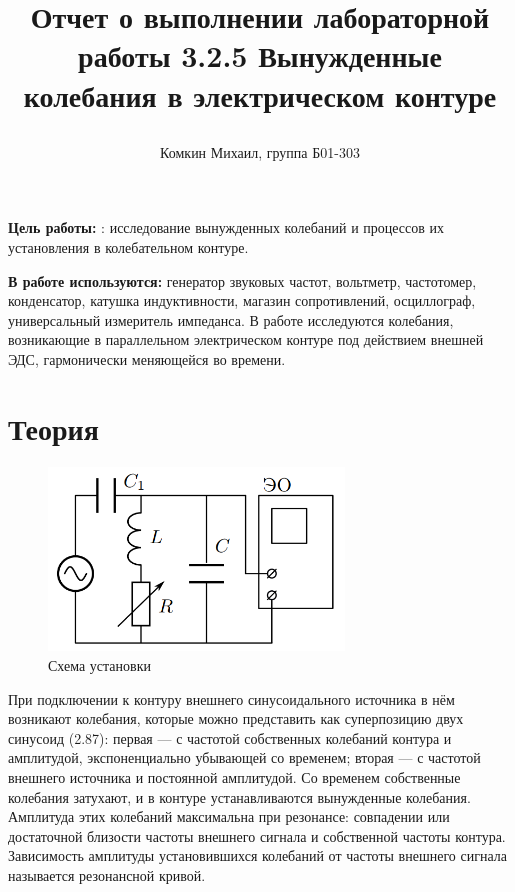 \documentclass[12pt,a4paper]{article}
\title{
Отчет о выполнении лабораторной работы 3.2.5
Вынужденные колебания в электрическом контуре

}
\author{Комкин Михаил, группа Б01-303}
\begin{document}
\maketitle

\textbf{Цель работы:} : исследование вынужденных колебаний и процессов их установления в колебательном контуре.


\textbf{В работе используются:} генератор звуковых частот, вольтметр, частотомер, конденсатор, катушка индуктивности, магазин сопротивлений, осциллограф, универсальный измеритель импеданса.
В работе исследуются колебания, возникающие в параллельном электрическом контуре под действием внешней ЭДС, гармонически меняющейся во времени.\\
\section{Теория}


\begin{figure}[h!]
	\begin{center}
		\includegraphics[width = 0.7\textwidth]{ust.png}
		\caption{Схема установки}
		\label{fig:facility}
	\end{center}
\end{figure}

При подключении к контуру внешнего синусоидального источника в
нём возникают колебания, которые можно представить как суперпозицию двух синусоид (2.87): первая — с частотой собственных колебаний
контура и амплитудой, экспоненциально убывающей со временем; вторая — с частотой внешнего источника и постоянной амплитудой. Со временем собственные колебания затухают, и в контуре устанавливаются
вынужденные колебания. Амплитуда этих колебаний максимальна при
резонансе: совпадении или достаточной близости частоты внешнего сигнала и собственной частоты контура. Зависимость амплитуды установившихся колебаний от частоты внешнего сигнала называется резонансной
кривой.
\end{document}
